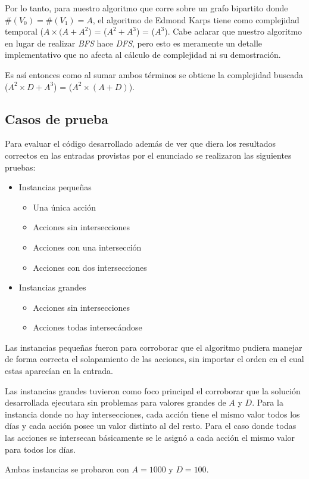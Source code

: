 Por lo tanto, para nuestro algoritmo que corre sobre un grafo bipartito donde
$\#(V_0) = \#(V_1) = A$, el algoritmo de Edmond Karps tiene como complejidad
temporal \ord($A \times (A + A^2$) = \ord($A^2 + A^3$) = \ord($A^3$). Cabe
aclarar que nuestro algoritmo en lugar de realizar \emph{BFS} hace
\emph{DFS}, pero esto es meramente un detalle implementativo que no afecta al
cálculo de complejidad ni su demostración.

Es así entonces como al sumar ambos términos se obtiene la complejidad buscada \ord($A^2 \times D +
A^3$) = \ord($A^2 \times (A + D)$).

\subsection{Casos de prueba}

Para evaluar el código desarrollado además de ver que diera los resultados
correctos en las entradas provistas por el enunciado se realizaron las
siguientes pruebas:

\begin{itemize}
	\item{Instancias pequeñas
		\begin{itemize}
			\item{Una única acción}
			\item{Acciones sin intersecciones}
			\item{Acciones con una intersección}
			\item{Acciones con dos intersecciones}
		\end{itemize}
	}
	\item{Instancias grandes
		\begin{itemize}
			\item{Acciones sin intersecciones}
			\item{Acciones todas intersecándose}
		\end{itemize}
	}
\end{itemize}

Las instancias pequeñas fueron para corroborar que el algoritmo pudiera manejar
de forma correcta el solapamiento de las acciones, sin importar el orden en el
cual estas aparecían en la entrada.

Las instancias grandes tuvieron como foco principal el corroborar que la
solución desarrollada ejecutara sin problemas para valores grandes de $A$ y $D$.
Para la instancia donde no hay intersecciones, cada acción tiene el mismo valor
todos los días y cada acción posee un valor distinto al del resto. Para el caso
donde todas las acciones se intersecan básicamente se le asignó a cada acción el
mismo valor para todos los días.

Ambas instancias se probaron con $A = 1000$ y $D = 100$.
